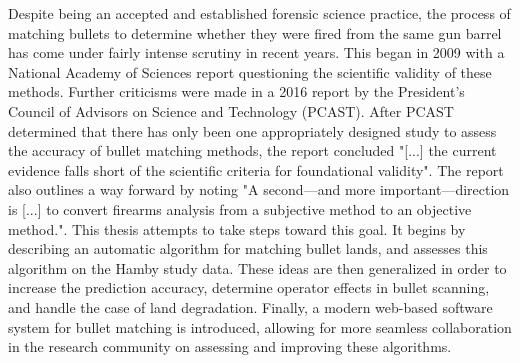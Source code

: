 
Despite being an accepted and established forensic science practice, the process of matching bullets to determine whether they were fired from the same gun barrel has come under fairly intense scrutiny in recent years. This began in 2009 with a National Academy of Sciences report questioning the scientific validity of these methods. Further criticisms were made in a 2016 report by the President's Council of Advisors on Science and Technology (PCAST). After PCAST determined that there has only been one appropriately designed study to assess the accuracy of bullet matching methods, the report concluded "[...] the current evidence falls short of the scientific criteria for foundational validity". The report also outlines a way forward by noting "A second—and more important—direction is [...] to convert firearms analysis from a subjective method to an objective method.". This thesis attempts to take steps toward this goal. It begins by describing an automatic algorithm for matching bullet lands, and assesses this algorithm on the Hamby study data. These ideas are then generalized in order to increase the prediction accuracy, determine operator effects in bullet scanning, and handle the case of land degradation. Finally, a modern web-based software system for bullet matching is introduced, allowing for more seamless collaboration in the research community on assessing and improving these algorithms.
